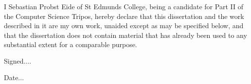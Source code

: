 I Sebastian Probst Eide of St Edmunds College, being a candidate for Part II of the Computer Science Tripos, hereby declare that this dissertation and the work described in it are my own work, unaided except as may be specified below, and that the dissertation does not contain material that has already been used to any substantial extent for a comparable purpose.

Signed....

Date...
